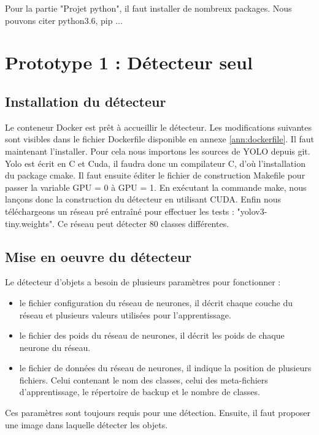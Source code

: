 \documentclass[debug,nodate,hideweeklyreports]{polytech/polytech}
\begin{document}
Pour la partie "Projet python", il faut installer de nombreux packages. Nous pouvons citer python3.6, pip ...

\section{Prototype 1 : Détecteur seul}

\subsection{Installation du détecteur}

Le conteneur Docker est prêt à accueillir le détecteur. 
Les modifications suivantes sont visibles dans le fichier Dockerfile disponible en annexe \autoref{ann:dockerfile}.
Il faut maintenant l'installer. Pour cela nous importons les sources de YOLO depuis git. Yolo est écrit en C et Cuda, il faudra donc un compilateur C, d'où l'installation du package cmake.
Il faut ensuite éditer le fichier de construction Makefile pour passer la variable GPU = 0 à GPU = 1. En exécutant la commande make, nous lançons donc la construction du détecteur en utilisant CUDA.
Enfin nous téléchargeons un réseau pré entraîné pour effectuer les tests : "yolov3-tiny.weights". Ce réseau peut détecter 80 classes différentes.

\subsection{Mise en oeuvre du détecteur}

Le détecteur d'objets a besoin de plusieurs paramètres pour fonctionner :

\begin{itemize}
\item le fichier configuration du réseau de neurones, il décrit chaque couche du réseau et plusieurs valeurs utilisées pour l'apprentissage.
\item le fichier des poids du réseau de neurones, il décrit les poids de chaque neurone du réseau.
\item le fichier de données du réseau de neurones, il indique la position de plusieurs fichiers. Celui contenant le nom des classes, celui des meta-fichiers d'apprentissage, le répertoire de backup et le nombre de classes.
\end{itemize}

Ces paramètres sont toujours requis pour une détection. Ensuite, il faut proposer une image dans laquelle détecter les objets.
\end{document}
